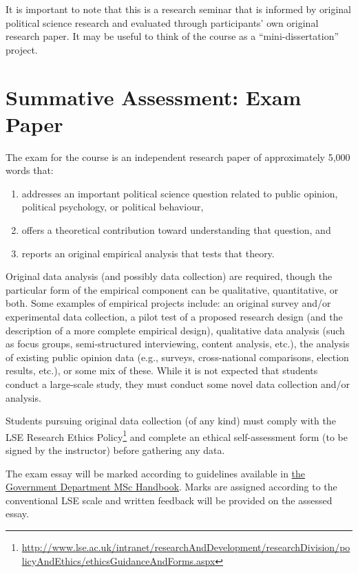 \documentclass[12pt,a4paper]{article}
\begin{document}
\noindent It is important to note that this is a research seminar that is informed by original political science research and evaluated through participants' own original research paper. It may be useful to think of the course as a ``mini-dissertation'' project.

\section{Summative Assessment: Exam Paper}

The exam for the course is an independent research paper of approximately 5,000 words that:

\begin{enumerate}
\item addresses an important political science question related to public opinion, political psychology, or political behaviour,
\item offers a theoretical contribution toward understanding that question, and 
\item reports an original empirical analysis that tests that theory.
\end{enumerate}

Original data analysis (and possibly data collection) are required, though the particular form of the empirical component can be qualitative, quantitative, or both. Some examples of empirical projects include: an original survey and/or experimental data collection, a pilot test of a proposed research design (and the description of a more complete empirical design), qualitative data analysis (such as focus groups, semi-structured interviewing, content analysis, etc.), the analysis of existing public opinion data (e.g., surveys, cross-national comparisons, election results, etc.), or some mix of these. While it is not expected that students conduct a large-scale study, they must conduct some novel data collection and/or analysis.

Students pursuing original data collection (of any kind) must comply with the LSE Research Ethics Policy\footnote{\url{http://www.lse.ac.uk/intranet/researchAndDevelopment/researchDivision/policyAndEthics/ethicsGuidanceAndForms.aspx}} and complete an ethical self-assessment form (to be signed by the instructor) before gathering any data.

The exam essay will be marked according to guidelines available in \href{http://www.lse.ac.uk/government/degreeProgrammes/programmes/masters/PDF/MSc-Student-Handbook.pdf}{the Government Department MSc Handbook}. Marks are assigned according to the conventional LSE scale and written feedback will be provided on the assessed essay.
\end{document}
